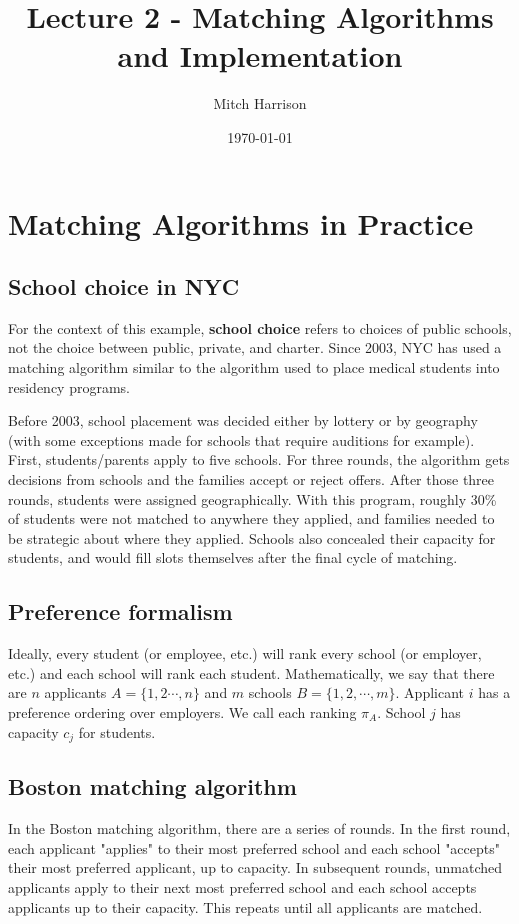 \documentclass[titlepage, 12pt, leqno]{article}
\title{\Huge{Lecture 2 - Matching Algorithms and Implementation}}
\author{\large{Mitch Harrison}}
\date{\today}
\begin{document}
\setlength{\parskip}{1\baselineskip}
\setlength{\parindent}{15pt}
\maketitle
\tableofcontents
\newpage


\section{Matching Algorithms in Practice}
\subsection{School choice in NYC}
For the context of this example, \textbf{school choice} refers to choices of 
public schools, not the choice between public, private, and charter. Since 2003,
NYC has used a matching algorithm similar to the algorithm used to place medical
students into residency programs.

Before 2003, school placement was decided either by lottery or by geography (with
some exceptions made for schools that require auditions for example). First,
students/parents apply to five schools. For three rounds, the algorithm gets 
decisions from schools and the families accept or reject offers. After those three
rounds, students were assigned geographically. With this program, roughly 30\% of 
students were not matched to anywhere they applied, and families needed to be
strategic about where they applied. Schools also concealed their capacity for
students, and would fill slots themselves after the final cycle of matching.

\subsection{Preference formalism}
Ideally, every student (or employee, etc.) will rank every school (or employer,
etc.) and each school will rank each student. Mathematically, we say that there 
are $n$ applicants $A = \{1,2 \cdots ,n\}$ and $m$ schools $B = \{1,2,\cdots,m\}$.
Applicant $i$ has a preference ordering over employers. We call each ranking 
$\pi_A$. School $j$ has capacity $c_j$ for students.

\subsection{Boston matching algorithm}
In the Boston matching algorithm, there are a series of rounds. In the first 
round, each applicant "applies" to their most preferred school and each school
"accepts" their most preferred applicant, up to capacity. In subsequent rounds, 
unmatched applicants apply to their next most preferred school and each school
accepts applicants up to their capacity. This repeats until all applicants are
matched.
\end{document}
